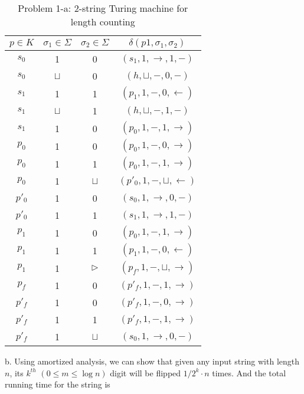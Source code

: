 \documentclass[12pt]{article}
\begin{document}
\begin{table}[ht!]
\begin{center}
\begin{tabular}{|ccc|c|}
  \hline

  $p \in K$ & $\sigma_1 \in \Sigma$ & $\sigma_2 \in \Sigma$
  & $\delta(p1,\sigma_1,\sigma_2)$ \\
  \hline
  $s_0$  &    1     &    0     &  $(s_1, 1, \to, 1, -)$  \\
  $s_0$  & $\sqcup$ &    0     &  $(h, \sqcup, -, 0, -)$  \\
  $s_1$  &    1     &    1     &  $(p_1, 1, -, 0, \gets)$  \\
  $s_1$  & $\sqcup$ &    1     &  $(h, \sqcup, -, 1, -)$  \\
  $s_1$  &    1     &    0     &  $(p_0, 1, -, 1, \to)$  \\
  $p_0$  &    1     &    0     &  $(p_0, 1, -, 0, \to)$ \\
  $p_0$  &    1     &    1     &  $(p_0, 1, -, 1, \to)$ \\
  $p_0$  &    1     & $\sqcup$ &  $(p'_0, 1, -, \sqcup, \gets)$ \\
  $p'_0$ &    1     &    0     &  $(s_0, 1, \to, 0, -)$ \\
  $p'_0$ &    1     &    1     &  $(s_1, 1, \to, 1, -)$ \\
  $p_1$  &    1     &    0     &  $(p_0, 1, -, 1, \to)$ \\
  $p_1$  &    1     &    1     &  $(p_1, 1, -, 0, \gets)$ \\
  $p_1$  &    1     & $\triangleright$ &  $(p_f, 1, -, \sqcup, \to)$ \\
  $p_f$  &    1     &    0     &  $(p'_f, 1, -, 1, \to)$ \\
  $p'_f$ &    1     &    0     &  $(p'_f, 1, -, 0, \to)$ \\
  $p'_f$ &    1     &    1     &  $(p'_f, 1, -, 1, \to)$ \\
  $p'_f$ &    1     & $\sqcup$ &  $(s_0, 1, \to, 0, -)$ \\

  \hline
\end{tabular}
\end{center}
\caption{Problem 1-a: 2-string Turing machine for length
  counting \label{tab:p1_a}}  
\end{table}

b. Using amortized analysis, we can show that given any input string
with length $n$, its $k^{th}$ $(0 \le m \le \log n)$ digit will be
flipped  $ 1 / 2^k \cdot n$ times. And the total running time for the
string is
\end{document}
